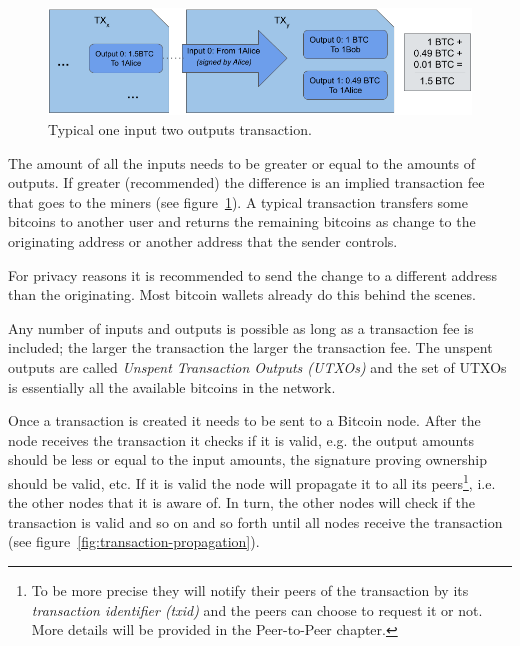 \begin{figure}[h]
\begin{center}
\includegraphics[scale=0.5]{images/typical-transaction}
\caption{Typical one input two outputs transaction.}
\label{fig:typical-transaction}
\end{center}
\end{figure}

The amount of all the inputs needs to be greater or equal to the amounts of outputs. If greater (recommended) the difference is an implied transaction fee that goes to the miners (see figure~\ref{fig:typical-transaction}). A typical transaction transfers some bitcoins to another user and returns the remaining bitcoins as change to the originating address or another address that the sender controls.

\begin{note}
For privacy reasons it is recommended to send the change to a different address than the originating. Most bitcoin wallets already do this behind the scenes.
\end{note}

Any number of inputs and outputs is possible as long as a transaction fee is included; the larger the transaction the larger the transaction fee. The unspent outputs are called \emph{Unspent Transaction Outputs (UTXOs)} and the set of UTXOs is essentially all the available bitcoins in the network.

Once a transaction is created it needs to be sent to a Bitcoin node. After the node receives the transaction it checks if it is valid, e.g. the output amounts should be less or equal to the input amounts, the signature proving ownership should be valid, etc. If it is valid the node will propagate it to all its peers\footnote{To be more precise they will notify their peers of the transaction by its \emph{transaction identifier (txid)} and the peers can choose to request it or not. More details will be provided in the Peer-to-Peer chapter.}, i.e. the other nodes that it is aware of. In turn, the other nodes will check if the transaction is valid and so on and so forth until all nodes receive the transaction (see figure~\ref{fig:transaction-propagation}).

